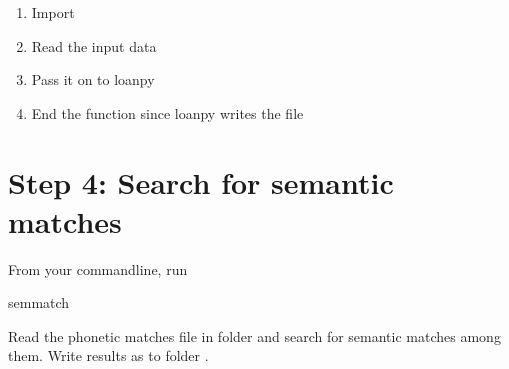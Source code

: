 \documentclass[letterpaper,10pt,english]{sphinxmanual}
\begin{document}
\begin{fulllineitems}
\label{\detokenize{workflow:gothuncommands.phonmatch.main}}
\pysigstartsignatures
{}
\pysigstopsignatures\begin{enumerate}
%
\item {} 
\sphinxAtStartPar
Import 

\item {} 
\sphinxAtStartPar
Read the input data

\item {} 
\sphinxAtStartPar
Pass it on to loanpy

\item {} 
\sphinxAtStartPar
End the function since loanpy writes the file

\end{enumerate}

\end{fulllineitems}



\section{Step 4: Search for semantic matches}
\label{\detokenize{workflow:step-4-search-for-semantic-matches}}
\sphinxAtStartPar
From your command\sphinxhyphen{}line, run

\begin{sphinxVerbatim}[commandchars=\\\{\}]
semmatch
\end{sphinxVerbatim}
\label{\detokenize{workflow:module-gothuncommands.semmatch}}
\sphinxAtStartPar
Read the phonetic matches file in folder  and search for
semantic matches among them. Write results as 
to folder .
\end{document}
